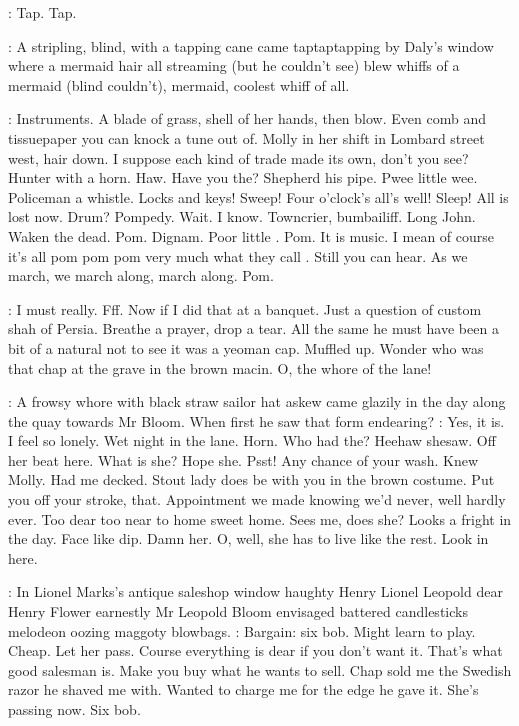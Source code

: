 \stripling:
Tap.
Tap.

:
A stripling,
blind,
with a tapping cane came taptaptapping
by Daly's window where a mermaid hair all streaming (but he couldn't see)
blew whiffs of a mermaid (blind couldn't),
mermaid,
coolest whiff of all.

\BloomInt:
Instruments.
A blade of grass,
shell of her hands,
then blow.
Even
comb and tissuepaper you can knock a tune out of.
Molly in her shift in
Lombard street west,
hair down.
I suppose each kind of trade made its own,
don't you see?
Hunter with a horn.
Haw.
Have you the?
Shepherd his pipe.
Pwee little wee.
Policeman a whistle.
Locks and keys!
Sweep!
Four o'clock's all's well!
Sleep!
All is lost now.
Drum?
Pompedy.
Wait.
I know.
Towncrier,
bumbailiff.
Long John.
Waken the dead.
Pom.
Dignam.
Poor little .
Pom.
It is music.
I mean of course it's
all pom pom pom very much what they call
.
Still you can hear.
As
we march,
we march along,
march along.
Pom.

\BloomInt:
I must really.
Fff.
Now if I did that at a banquet.
Just a question of
custom shah of Persia.
Breathe a prayer,
drop a tear.
All the same he must
have been a bit of a natural not to see it was a yeoman cap.
Muffled up.
Wonder who was that chap at the grave in the brown macin.
O,
the whore of the lane!

:
A frowsy whore with black straw sailor hat askew came glazily in the
day along the quay towards Mr Bloom.
When first he saw that form
endearing?
\BloomInt:
Yes,
it is.
I feel so lonely.
Wet night in the lane.
Horn.
Who
had the?
Heehaw shesaw.
Off her beat here.
What is she?
Hope she.
Psst!
Any chance of your wash.
Knew Molly.
Had me decked.
Stout lady does be
with you in the brown costume.
Put you off your stroke,
that.
Appointment
we made knowing we'd never,
well hardly ever.
Too dear too near to home
sweet home.
Sees me,
does she?
Looks a fright in the day.
Face like dip.
Damn her.
O,
well,
she has to live like the rest.
Look in here.

:
In Lionel Marks's antique saleshop window haughty Henry Lionel
Leopold dear Henry Flower earnestly Mr Leopold Bloom envisaged
battered candlesticks melodeon oozing maggoty blowbags.
\BloomInt:
Bargain:
six bob.
Might learn to play.
Cheap.
Let her pass.
Course everything is dear if
you don't want it.
That's what good salesman is.
Make you buy what he
wants to sell.
Chap sold me the Swedish razor he shaved me with.
Wanted
to charge me for the edge he gave it.
She's passing now.
Six bob.

